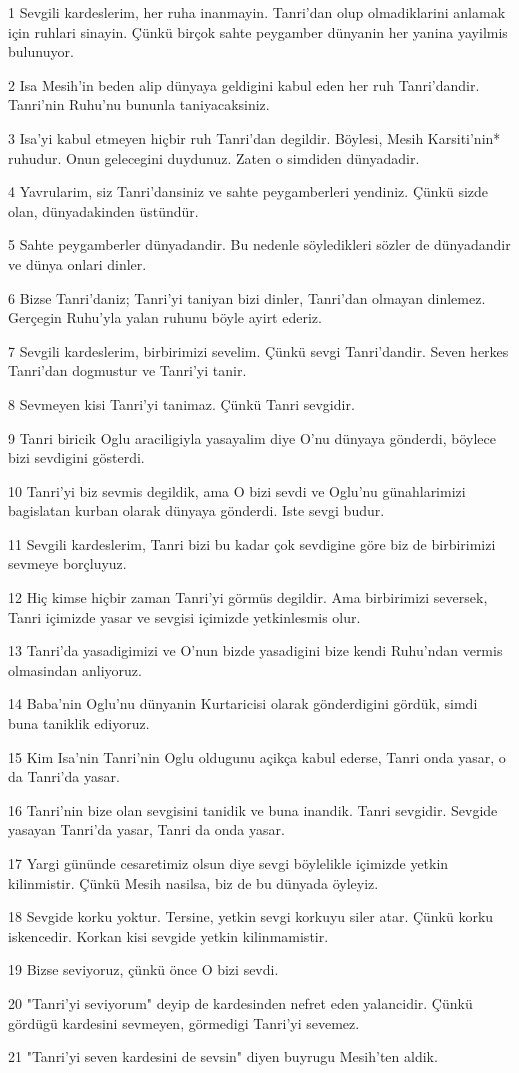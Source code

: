 \par 1 Sevgili kardeslerim, her ruha inanmayin. Tanri'dan olup olmadiklarini anlamak için ruhlari sinayin. Çünkü birçok sahte peygamber dünyanin her yanina yayilmis bulunuyor.
\par 2 Isa Mesih'in beden alip dünyaya geldigini kabul eden her ruh Tanri'dandir. Tanri'nin Ruhu'nu bununla taniyacaksiniz.
\par 3 Isa'yi kabul etmeyen hiçbir ruh Tanri'dan degildir. Böylesi, Mesih Karsiti'nin* ruhudur. Onun gelecegini duydunuz. Zaten o simdiden dünyadadir.
\par 4 Yavrularim, siz Tanri'dansiniz ve sahte peygamberleri yendiniz. Çünkü sizde olan, dünyadakinden üstündür.
\par 5 Sahte peygamberler dünyadandir. Bu nedenle söyledikleri sözler de dünyadandir ve dünya onlari dinler.
\par 6 Bizse Tanri'daniz; Tanri'yi taniyan bizi dinler, Tanri'dan olmayan dinlemez. Gerçegin Ruhu'yla yalan ruhunu böyle ayirt ederiz.
\par 7 Sevgili kardeslerim, birbirimizi sevelim. Çünkü sevgi Tanri'dandir. Seven herkes Tanri'dan dogmustur ve Tanri'yi tanir.
\par 8 Sevmeyen kisi Tanri'yi tanimaz. Çünkü Tanri sevgidir.
\par 9 Tanri biricik Oglu araciligiyla yasayalim diye O'nu dünyaya gönderdi, böylece bizi sevdigini gösterdi.
\par 10 Tanri'yi biz sevmis degildik, ama O bizi sevdi ve Oglu'nu günahlarimizi bagislatan kurban olarak dünyaya gönderdi. Iste sevgi budur.
\par 11 Sevgili kardeslerim, Tanri bizi bu kadar çok sevdigine göre biz de birbirimizi sevmeye borçluyuz.
\par 12 Hiç kimse hiçbir zaman Tanri'yi görmüs degildir. Ama birbirimizi seversek, Tanri içimizde yasar ve sevgisi içimizde yetkinlesmis olur.
\par 13 Tanri'da yasadigimizi ve O'nun bizde yasadigini bize kendi Ruhu'ndan vermis olmasindan anliyoruz.
\par 14 Baba'nin Oglu'nu dünyanin Kurtaricisi olarak gönderdigini gördük, simdi buna taniklik ediyoruz.
\par 15 Kim Isa'nin Tanri'nin Oglu oldugunu açikça kabul ederse, Tanri onda yasar, o da Tanri'da yasar.
\par 16 Tanri'nin bize olan sevgisini tanidik ve buna inandik. Tanri sevgidir. Sevgide yasayan Tanri'da yasar, Tanri da onda yasar.
\par 17 Yargi gününde cesaretimiz olsun diye sevgi böylelikle içimizde yetkin kilinmistir. Çünkü Mesih nasilsa, biz de bu dünyada öyleyiz.
\par 18 Sevgide korku yoktur. Tersine, yetkin sevgi korkuyu siler atar. Çünkü korku iskencedir. Korkan kisi sevgide yetkin kilinmamistir.
\par 19 Bizse seviyoruz, çünkü önce O bizi sevdi.
\par 20 "Tanri'yi seviyorum" deyip de kardesinden nefret eden yalancidir. Çünkü gördügü kardesini sevmeyen, görmedigi Tanri'yi sevemez.
\par 21 "Tanri'yi seven kardesini de sevsin" diyen buyrugu Mesih'ten aldik.

